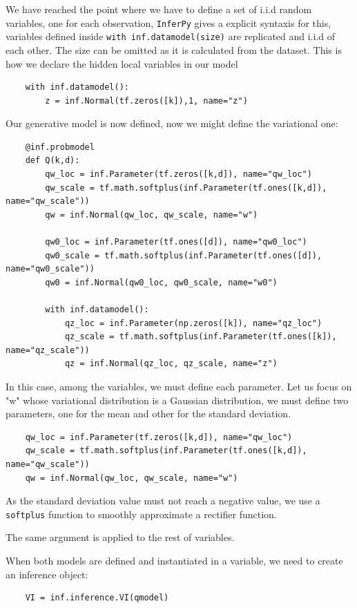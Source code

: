 We have reached the point where we have to define a set of i.i.d random variables, one for each observation, \texttt{InferPy} gives a explicit syntaxis for this, variables defined inside \texttt{with inf.datamodel(size)} are replicated and i.i.d of each other. The size can be omitted as it is calculated from the dataset.
This is how we declare the hidden local variables in our model
\begin{verbatim}
    with inf.datamodel():
        z = inf.Normal(tf.zeros([k]),1, name="z")  
\end{verbatim}

Our generative model is now defined, now we might define the variational one:

\begin{verbatim}
    @inf.probmodel
    def Q(k,d):
        qw_loc = inf.Parameter(tf.zeros([k,d]), name="qw_loc")
        qw_scale = tf.math.softplus(inf.Parameter(tf.ones([k,d]), name="qw_scale"))
        qw = inf.Normal(qw_loc, qw_scale, name="w")

        qw0_loc = inf.Parameter(tf.ones([d]), name="qw0_loc")
        qw0_scale = tf.math.softplus(inf.Parameter(tf.ones([d]), name="qw0_scale"))
        qw0 = inf.Normal(qw0_loc, qw0_scale, name="w0")
    
        with inf.datamodel():
            qz_loc = inf.Parameter(np.zeros([k]), name="qz_loc")
            qz_scale = tf.math.softplus(inf.Parameter(tf.ones([k]), name="qz_scale"))
            qz = inf.Normal(qz_loc, qz_scale, name="z")
\end{verbatim}

In this case, among the variables, we must define each parameter. Let us focus on "w" whose variational distribution is a Gaussian distribution, we must define two parameters, one for the mean and other for the standard deviation.

\begin{verbatim}
    qw_loc = inf.Parameter(tf.zeros([k,d]), name="qw_loc")
    qw_scale = tf.math.softplus(inf.Parameter(tf.ones([k,d]), name="qw_scale"))
    qw = inf.Normal(qw_loc, qw_scale, name="w")
\end{verbatim}

As the standard deviation value must not reach a negative value, we use a \texttt{softplus} function to smoothly approximate a rectifier function. 

The same argument is applied to the rest of variables.

When both models are defined and instantiated in a variable, we need to create an inference object:
\begin{verbatim}
    VI = inf.inference.VI(qmodel)
\end{verbatim}

